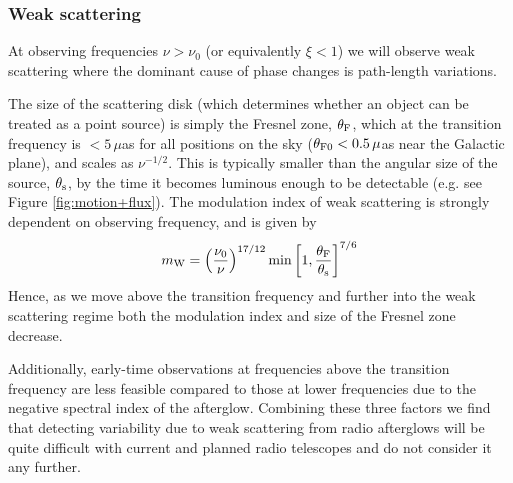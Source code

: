 \subsubsection{Weak scattering}
At observing frequencies $\nu > \nu_0$ (or equivalently $\xi < 1$) we will observe weak scattering where the dominant cause of phase changes is path-length variations.

The size of the scattering disk (which determines whether an object can be treated as a point source) is simply the Fresnel zone, $\theta_{\rm F}$, which at the transition frequency is $<5\,\mu$as for all positions on the sky ($\theta_{\rm F0}<0.5\,\mu$as near the Galactic plane), and scales as $\nu^{-1/2}$. This is typically smaller than the angular size of the source, $\theta_{\rm s}$, by the time it becomes luminous enough to be detectable (e.g. see Figure \ref{fig:motion+flux}). The modulation index of weak scattering is strongly dependent on observing frequency, and is given by
\begin{equation}
    m_{\rm W} = \left(\frac{\nu_0}{\nu}\right)^{17/12}\min\left[1,\frac{\theta_{\rm F}}{\theta_{\rm s}}\right]^{7/6}
\end{equation}
Hence, as we move above the transition frequency and further into the weak scattering regime both the modulation index and size of the Fresnel zone decrease.

Additionally, early-time observations at frequencies above the transition frequency are less feasible compared to those at lower frequencies due to the negative spectral index of the afterglow. Combining these three factors we find that detecting variability due to weak scattering from radio afterglows will be quite difficult with current and planned radio telescopes and do not consider it any further.

\pagebreak

